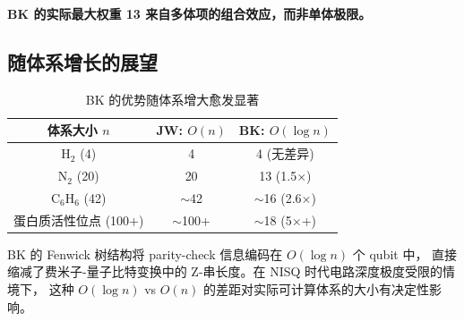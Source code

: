 \documentclass[fontset=mac]{ctexart}
\begin{document}
\textbf{BK 的实际最大权重 13 来自多体项的组合效应，而非单体极限。}

\subsection*{随体系增长的展望}

\begin{table}[H]
\centering
\begin{tabular}{ccc}
\toprule
\textbf{体系大小 $n$} & \textbf{JW: $O(n)$} & \textbf{BK: $O(\log n)$}\\
\midrule
H$_2$   (4)   & 4  & 4  \quad (无差异) \\
N$_2$   (20)  & 20 & 13 \quad (1.5$\times$) \\
C$_6$H$_6$ (42) & $\sim$42 & $\sim$16 \quad (2.6$\times$) \\
蛋白质活性位点 (100+) & $\sim$100+ & $\sim$18 \quad (5$\times$+) \\
\bottomrule
\end{tabular}
\caption{BK 的优势随体系增大愈发显著}
\end{table}

BK 的 Fenwick 树结构将 parity-check 信息编码在 $O(\log n)$ 个 qubit 中，
直接缩减了费米子-量子比特变换中的 Z-串长度。在 NISQ 时代电路深度极度受限的情境下，
这种 $O(\log n)$ vs $O(n)$ 的差距对实际可计算体系的大小有决定性影响。
\end{document}
